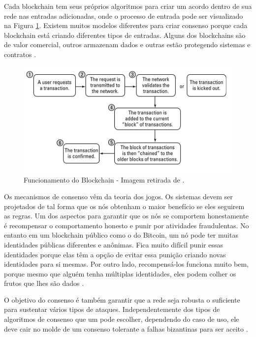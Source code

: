         Cada blockchain tem seus próprios algoritmos para criar um acordo dentro de sua rede nas entradas adicionadas, onde o processo de entrada pode ser visualizado na Figura \ref{fig:blockchain_work_dummies}. Existem muitos modelos diferentes para criar consenso porque cada blockchain está criando diferentes tipos de entradas. Alguns dos blockchains são de valor comercial, outros armazenam dados e outras estão protegendo sistemas e contratos \cite{blockchain_for_dummies}.
        
        
                \begin{figure}[h]
                     \centering
                     \includegraphics[scale=0.7]{figuras/capitulo_2/blockchain_come_to_agreement.png}
                     \caption{Funcionamento do Blockchain - Imagem retirada de \cite{blockchain_for_dummies}.}
                     \label{fig:blockchain_work_dummies}
                \end{figure}
        
        Os mecanismos de consenso vêm da teoria dos jogos. Os sistemas devem ser projetados de tal forma que os nós obtenham o maior benefício se eles seguirem as regras. Um dos aspectos para garantir que os nós se comportem honestamente é recompensar o comportamento honesto e punir por atividades fraudulentas. No entanto em um blockchain público como o do Bitcoin, um nó pode ter muitas identidades públicas diferentes e anônimas. Fica muito difícil punir essas identidades porque elas têm a opção de evitar essa punição criando novas identidades para si mesmas. Por outro lado, recompensá-los funciona muito bem, porque mesmo que alguém tenha múltiplas identidades, eles podem colher os frutos que lhes são dados \cite{beginnig_blockchain_bikramaditya}.
        
        O objetivo do consenso é também garantir que a rede seja robusta o suficiente para sustentar vários tipos de ataques. Independentemente dos tipos de algoritmos de consenso que um pode escolher, dependendo do caso de uso, ele deve cair no molde de um consenso tolerante a falhas bizantinas para ser aceito \cite{beginnig_blockchain_bikramaditya}.
        

